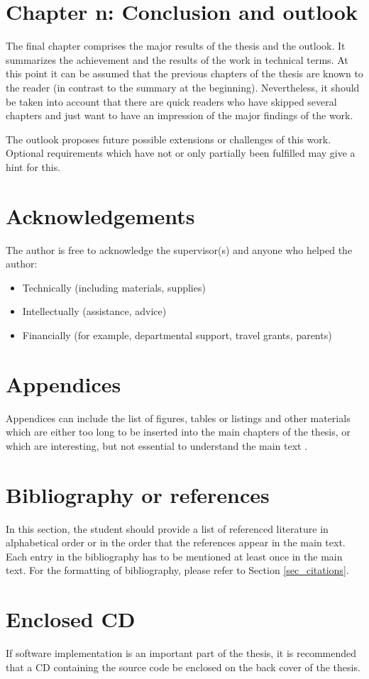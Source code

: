 \section{Chapter n: Conclusion and outlook}

The final chapter comprises the major results of the thesis and the outlook. It summarizes the achievement and the results of the work in technical terms. At this point it can be assumed that the previous chapters of the thesis are known to the reader (in contrast to the summary at the beginning). Nevertheless, it should be taken into account that there are quick readers who have skipped several chapters and just want to have an impression of the major findings of the work.

The outlook proposes future possible extensions or challenges of this work. Optional requirements which have not or only partially been fulfilled may give a hint for this.


\section{Acknowledgements}

The author is free to acknowledge the supervisor(s) and anyone who helped the author: 
\begin{itemize}
\item Technically (including materials, supplies)
\item Intellectually (assistance, advice)
\item Financially (for example, departmental support, travel grants, parents)
\end{itemize}

\section{Appendices}

Appendices can include the list of figures, tables or listings and other materials which are either too long to be inserted into the main chapters of the thesis, or which are interesting, but not essential to understand the main text \cite{les06}.

\section{Bibliography or references}

In this section, the student should provide a list of referenced literature in alphabetical order or in the order that the references appear in the main text. Each entry in the bibliography has to be mentioned at least once in the main text. For the formatting of bibliography, please refer to Section \ref{sec_citations}.

\section{Enclosed CD} \label{sec_CD}

If software implementation is an important part of the thesis, it is recommended that a CD containing the source code be enclosed on the back cover of the thesis.

\endinput 